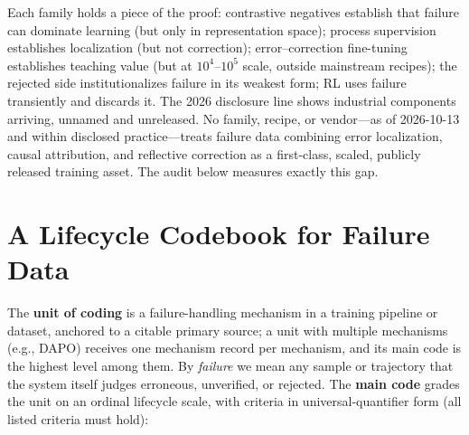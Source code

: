 \documentclass[10pt]{article}
\begin{document}
Each family holds a piece of the proof: contrastive negatives establish that failure can dominate learning (but only in representation space); process supervision establishes localization (but not correction); error--correction fine-tuning establishes teaching value (but at $10^4$--$10^5$ scale, outside mainstream recipes); the rejected side institutionalizes failure in its weakest form; RL uses failure transiently and discards it. The 2026 disclosure line shows industrial components arriving, unnamed and unreleased. No family, recipe, or vendor---as of 2026-10-13 and within disclosed practice---treats failure data combining error localization, causal attribution, and reflective correction as a first-class, scaled, publicly released training asset. The audit below measures exactly this gap.

\section{A Lifecycle Codebook for Failure Data}\label{sec:codebook}

The \textbf{unit of coding} is a failure-handling mechanism in a training pipeline or dataset, anchored to a citable primary source; a unit with multiple mechanisms (e.g., DAPO) receives one mechanism record per mechanism, and its main code is the highest level among them. By \emph{failure} we mean any sample or trajectory that the system itself judges erroneous, unverified, or rejected. The \textbf{main code} grades the unit on an ordinal lifecycle scale, with criteria in universal-quantifier form (all listed criteria must hold):
\end{document}
